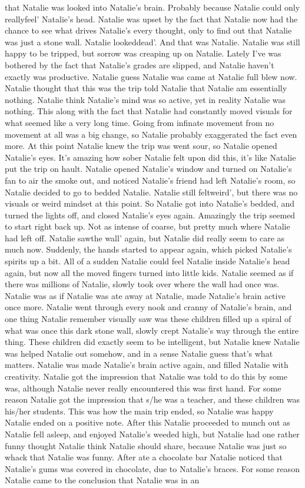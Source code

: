 \documentclass[12pt]{book}
\begin{document}
that Natalie was looked into Natalie's brain. Probably because Natalie could only reallyfeel' Natalie's head. Natalie was upset by the fact that Natalie now had the chance to see what drives Natalie's every thought, only to find out that Natalie was just a stone wall. Natalie lookeddead'. And that was Natalie. Natalie was still happy to be tripped, but sorrow was creaping up on Natalie. Lately I've was bothered by the fact that Natalie's grades are slipped, and Natalie haven't exactly was productive. Natalie guess Natalie was came at Natalie full blew now. Natalie thought that this was the trip told Natalie that Natalie am essentially nothing. Natalie think Natalie's mind was so active, yet in reality Natalie was nothing. This along with the fact that Natalie had constantly moved visuals for what seemed like a very long time. Going from infinate movement from no movement at all was a big change, so Natalie probably exaggerated the fact even more. At this point Natalie knew the trip was went sour, so Natalie opened Natalie's eyes. It's amazing how sober Natalie felt upon did this, it's like Natalie put the trip on hault. Natalie opened Natalie's window and turned on Natalie's fan to air the smoke out, and noticed Natalie's friend had left Natalie's room, so Natalie decided to go to bedded Natalie. Natalie still feltweird', but there was no visuals or weird mindset at this point. So Natalie got into Natalie's bedded, and turned the lights off, and closed Natalie's eyes again. Amazingly the trip seemed to start right back up. Not as intense of coarse, but pretty much where Natalie had left off. Natalie sawthe wall' again, but Natalie did really seem to care as much now. Suddenly, the hands started to appear again, which picked Natalie's spirits up a bit. All of a sudden Natalie could feel Natalie inside Natalie's head again, but now all the moved fingers turned into little kids. Natalie seemed as if there was millions of Natalie, slowly took over where the wall had once was. Natalie was as if Natalie was ate away at Natalie, made Natalie's brain active once more. Natalie went through every nook and cranny of Natalie's brain, and one thing Natalie remember visually saw was these children filled up a spiral of what was once this dark stone wall, slowly crept Natalie's way through the entire thing. These children did exactly seem to be intelligent, but Natalie knew Natalie was helped Natalie out somehow, and in a sense Natalie guess that's what matters. Natalie was made Natalie's brain active again, and filled Natalie with creativity. Natalie got the impression that Natalie was told to do this by some was, although Natalie never really encountered this was first hand. For some reason Natalie got the impression that s/he was a teacher, and these children was his/her students. This was how the main trip ended, so Natalie was happy Natalie ended on a positive note. After this Natalie proceeded to munch out as Natalie fell asleep, and enjoyed Natalie's weeded high, but Natalie had one rather funny thought Natalie think Natalie should share, because Natalie was just so whack that Natalie was funny. After ate a chocolate bar Natalie noticed that Natalie's gums was covered in chocolate, due to Natalie's braces. For some reason Natalie came to the conclusion that Natalie was in an 
\end{document}
